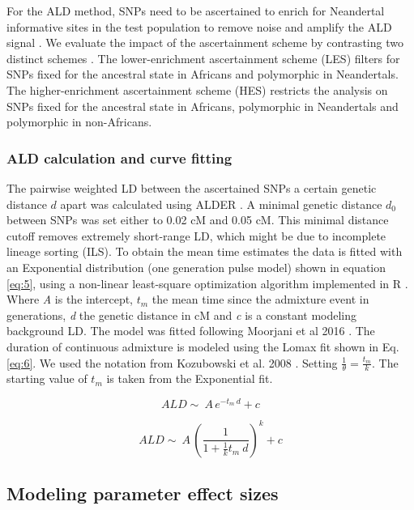 \documentclass[]{article}
\begin{document}
For the ALD method, SNPs need to be ascertained to enrich for
Neandertal informative sites in the test population to remove noise and
amplify the ALD signal \citep{sankararaman_date_2012}. 
We evaluate the impact of the ascertainment scheme by contrasting two distinct schemes \citep{sankararaman_date_2012,fu_genome_2014}. The lower-enrichment
ascertainment scheme (LES) filters for SNPs fixed for the ancestral state in
Africans and polymorphic in Neandertals. The higher-enrichment
ascertainment scheme (HES) restricts the analysis on SNPs fixed for the
ancestral state in Africans, polymorphic in Neandertals and polymorphic
in non-Africans.

\subsubsection{ALD calculation and curve fitting}\label{ALD calculation and curve fitting}

The pairwise weighted LD between the ascertained SNPs a certain genetic
distance \(d\) apart was calculated using ALDER
\citep{loh_inferring_2013}. A minimal genetic distance \(d_0\) between
SNPs was set either to 0.02 cM and 0.05 cM. This minimal distance cutoff
removes extremely short-range LD, which might be due to incomplete lineage sorting (ILS). To obtain the mean time estimates
the data is fitted with an Exponential distribution (one generation pulse model) shown in equation
\ref{eq:5}, using a non-linear least-square optimization algorithm
implemented in R \citep{R_Core_Team_2019}. Where \emph{A} is the
intercept, $t_m$ the mean time since the admixture event in generations,
\emph{d} the genetic distance in cM and \emph{c} is a constant modeling
background LD. The model was fitted following Moorjani et al 2016
\citep{moorjani_genetic_2016}. The duration of continuous admixture is
modeled using the Lomax fit shown in Eq. \ref{eq:6}. We used the
notation from Kozubowski et al. 2008 \citep{Kozubowski_Testing_2008}. Setting $\frac{1}{\theta} = \frac{t_m}{k}$.
The starting value of $t_m$  is taken from the Exponential fit.


\begin{equation}
\label{eq:5}
ALD \sim\ A\,e^{-t_m \:d}+c
\end{equation}

\begin{equation}
\label{eq:6}
ALD \sim\ A\,\left( \frac{1}{1 + \frac{1}{k}t_m \:d}\right) ^k+c
\end{equation}


\subsection{Modeling parameter effect sizes}\label{modeling prameter effect sizes}
\end{document}
